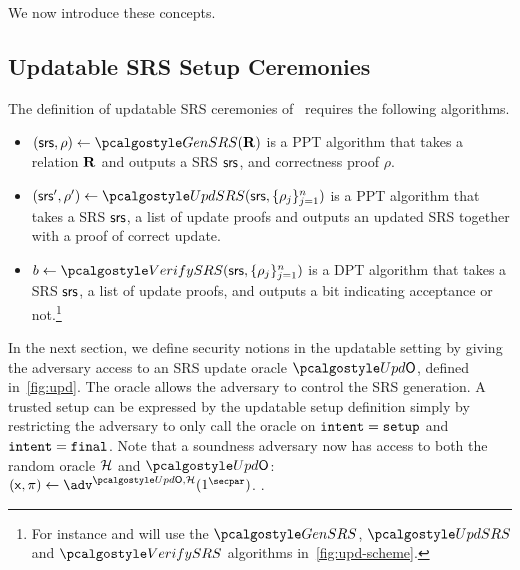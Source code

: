 We now introduce these concepts.
\fi


\subsection{Updatable SRS Setup Ceremonies}\label{def:upd-scheme}


The definition of updatable SRS ceremonies of~\cite{C:GKMMM18} requires the following algorithms.

\begin{itemize} 
	\item
	$(\srs,\rho) \gets \kgen(\REL)$ is a PPT algorithm that takes a relation $\mathbf{R}$ and outputs a SRS $\mathsf{srs}$, and correctness proof $\rho$.
	\item
	$ (\srs',\rho') \gets \upd(\srs, \{\rho_j \}_{j=1}^n)$ is a PPT algorithm that takes a SRS $\mathsf{srs}$, a list of update proofs and outputs an updated SRS together with a proof of correct update. 
	\item
	$b \gets \verifyCRS(\srs, \{\rho_j \}_{j=1}^n)$ is a DPT algorithm that takes a SRS $\mathsf{srs}$, a list of update proofs, and outputs a bit indicating acceptance or not.\footnote{For instance \plonk{} and \marlin{} will use the $\kgen$, $\upd$ and $\verifyCRS$ algorithms in~\cref{fig:upd-scheme}.}
\end{itemize}



In the next section, we define security notions in the updatable setting by giving the adversary access to an SRS update oracle $\initU$, defined in~\cref{fig:upd}. The oracle allows the adversary to control the SRS generation. A trusted setup can be expressed by the updatable setup definition simply by restricting the adversary to only call the oracle on $\mathtt{intent} = \mathtt{setup}$ and $\mathtt{intent} = \mathtt{final}$. Note that a soundness adversary now has access to both the random oracle $\mathcal{H}$ and $\initU$:  $(\inp, \zkproof) \gets \adv^{\initU,\ro}(1^\secpar)$. .

\newcommand*{\Scale}[2][4]{\scalebox{#1}{$#2$}}%

